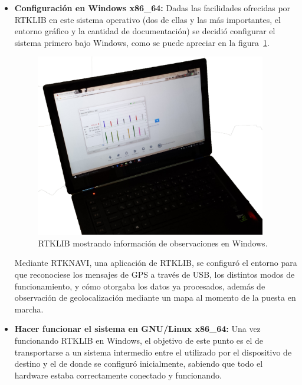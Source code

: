 \begin{itemize}
\item \textbf{Configuración en Windows x86\_64:} Dadas las facilidades ofrecidas por RTKLIB en este sistema operativo (dos de ellas y las más importantes, el entorno gráfico y la cantidad de documentación) se decidió configurar el sistema primero bajo Windows, como se puede apreciar en la figura~\ref{fig:RTKWin}. \\

\begin{figure}[H]
\centering
\includegraphics[width=0.95\textwidth]{Figures/BaseStatWin}
\caption[RTKLIB mostrando información de observaciones en Windows.]{RTKLIB mostrando información de observaciones en Windows.}
\label{fig:RTKWin}
\end{figure}

Mediante RTKNAVI, una aplicación de RTKLIB, se configuró el entorno para que reconociese los mensajes de GPS a través de USB, los distintos modos de funcionamiento, y cómo otorgaba los datos ya procesados, además de observación de geolocalización mediante un mapa al momento de la puesta en marcha.\\

\item \textbf{Hacer funcionar el sistema en GNU/Linux x86\_64:} Una vez funcionando RTKLIB en Windows, el objetivo de este punto es el de transportarse a un sistema intermedio entre el utilizado por el dispositivo de destino y el de donde se configuró inicialmente, sabiendo que todo el hardware estaba correctamente conectado y funcionando.\\ 


\end{itemize}
